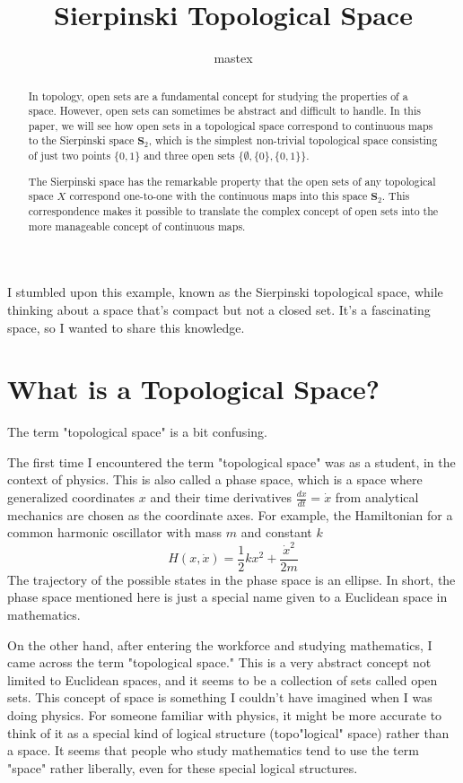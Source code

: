 \documentclass[article,letterpaper,12pt]{jsarticle}
\title{
Sierpinski Topological Space
}
\author{
mastex
}
\begin{document}
\maketitle

I stumbled upon this example, known as the Sierpinski topological space, while thinking about a space that's compact but not a closed set. It's a fascinating space, so I wanted to share this knowledge.

\begin{abstract}
	In topology, open sets are a fundamental concept for studying the properties of a space. However, open sets can sometimes be abstract and difficult to handle. In this paper, we will see how open sets in a topological space correspond to continuous maps to the Sierpinski space $\mathbf{S}_ {2}$, which is the simplest non-trivial topological space consisting of just two points $\{0, 1\}$ and three open sets $\{\emptyset, \{0\}, \{0, 1\}\}$.

	The Sierpinski space has the remarkable property that the open sets of any topological space $X$ correspond one-to-one with the continuous maps into this space $\mathbf{S}_ {2}$. This correspondence makes it possible to translate the complex concept of open sets into the more manageable concept of continuous maps.
\end{abstract}

\section{What is a Topological Space?}

The term "topological space" is a bit confusing.

The first time I encountered the term "topological space" was as a student, in the context of physics.
This is also called a phase space,
which is a space where generalized coordinates $x$ and their time derivatives $\frac{dx}{dt} = \dot{x}$ from analytical mechanics are chosen as the coordinate axes.
For example, the Hamiltonian for a common harmonic oscillator with mass $m$ and constant $k$
$$
	H(x,\dot{x}) = \frac{1}{2}kx^{2}  + \frac{\dot{x}^{2}}{2m}
$$
The trajectory of the possible states in the phase space is an ellipse.
In short, the phase space mentioned here is just a special name given to a Euclidean space in mathematics.

On the other hand, after entering the workforce and studying mathematics, I came across the term "topological space."
This is a very abstract concept not limited to Euclidean spaces, and it seems to be a collection of sets called open sets.
This concept of space is something I couldn't have imagined when I was doing physics. For someone familiar with physics, it might be more accurate to think of it as a special kind of logical structure (topo"logical" space) rather than a space.
It seems that people who study mathematics tend to use the term "space" rather liberally, even for these special logical structures.
\end{document}
